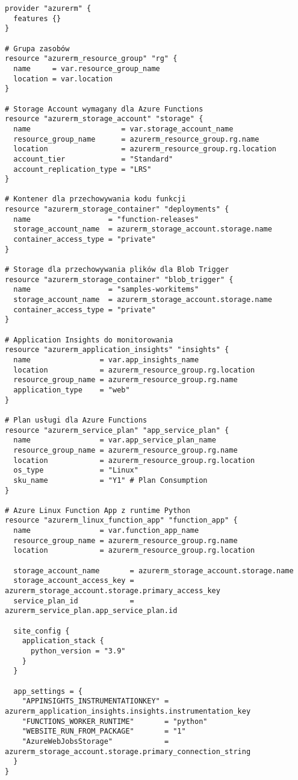 \documentclass{article}
\begin{document}
\begin{lstlisting}[]
provider "azurerm" {
  features {}
}

# Grupa zasobów
resource "azurerm_resource_group" "rg" {
  name     = var.resource_group_name
  location = var.location
}

# Storage Account wymagany dla Azure Functions
resource "azurerm_storage_account" "storage" {
  name                     = var.storage_account_name
  resource_group_name      = azurerm_resource_group.rg.name
  location                 = azurerm_resource_group.rg.location
  account_tier             = "Standard"
  account_replication_type = "LRS"
}

# Kontener dla przechowywania kodu funkcji
resource "azurerm_storage_container" "deployments" {
  name                  = "function-releases"
  storage_account_name  = azurerm_storage_account.storage.name
  container_access_type = "private"
}

# Storage dla przechowywania plików dla Blob Trigger
resource "azurerm_storage_container" "blob_trigger" {
  name                  = "samples-workitems"
  storage_account_name  = azurerm_storage_account.storage.name
  container_access_type = "private"
}

# Application Insights do monitorowania
resource "azurerm_application_insights" "insights" {
  name                = var.app_insights_name
  location            = azurerm_resource_group.rg.location
  resource_group_name = azurerm_resource_group.rg.name
  application_type    = "web"
}

# Plan usługi dla Azure Functions
resource "azurerm_service_plan" "app_service_plan" {
  name                = var.app_service_plan_name
  resource_group_name = azurerm_resource_group.rg.name
  location            = azurerm_resource_group.rg.location
  os_type             = "Linux"
  sku_name            = "Y1" # Plan Consumption
}

# Azure Linux Function App z runtime Python
resource "azurerm_linux_function_app" "function_app" {
  name                = var.function_app_name
  resource_group_name = azurerm_resource_group.rg.name
  location            = azurerm_resource_group.rg.location

  storage_account_name       = azurerm_storage_account.storage.name
  storage_account_access_key = azurerm_storage_account.storage.primary_access_key
  service_plan_id            = azurerm_service_plan.app_service_plan.id
  
  site_config {
    application_stack {
      python_version = "3.9"
    }
  }

  app_settings = {
    "APPINSIGHTS_INSTRUMENTATIONKEY" = azurerm_application_insights.insights.instrumentation_key
    "FUNCTIONS_WORKER_RUNTIME"       = "python"
    "WEBSITE_RUN_FROM_PACKAGE"       = "1"
    "AzureWebJobsStorage"            = azurerm_storage_account.storage.primary_connection_string
  }
}
\end{lstlisting}
\end{document}
